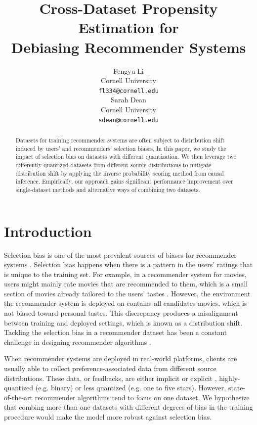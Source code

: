 \documentclass{article}
\title{Cross-Dataset Propensity Estimation for \\Debiasing Recommender Systems}
\author{%
  Fengyu Li \\
  Cornell University\\
  \texttt{fl334@cornell.edu} \\
  \And
  Sarah Dean \\
  Cornell University \\
  \texttt{sdean@cornell.edu} \\
}
\begin{document}
\maketitle


\begin{abstract}
  Datasets for training recommender systems are often subject to distribution shift induced by users' and recommenders' selection biases. In this paper, we study the impact of selection bias on datasets with different quantization. We then leverage two differently quantized datasets from different source distributions to mitigate distribution shift by applying the inverse probability scoring method from causal inference. Empirically, our approach gains significant performance improvement over single-dataset methods and alternative ways of combining two datasets. 
\end{abstract}

\section{Introduction}
Selection bias is one of the most prevalent sources of biases for recommender systems \cite{chen2020bias}. Selection bias happens when there is a pattern in the users' ratings that is unique to the training set. For example, in a recommender system for movies, users might mainly rate movies that are recommended to them, which is a small section of movies already tailored to the users' tastes \cite{pradel2012ranking}. However, the environment the recommender system is deployed on contains all candidates movies, which is not biased toward personal tastes. This discrepancy produces a misalignment between training and deployed settings, which is known as a distribution shift. Tackling the selection bias in a recommender dataset has been a constant challenge in designing recommender algorithms \cite{schnabel2016recommendations}.

When recommender systems are deployed in real-world platforms, clients are usually able to collect preference-associated data from different source distributions. These data, or feedbacks, are either implicit or explicit \cite{aggarwal2016recommender}, highly-quantized (e.g. binary) or less quantized (e.g. one to five stars). However, state-of-the-art recommender algorithms tend to focus on one dataset. We hypothesize that combing more than one datasets with different degrees of bias in the training procedure would make the model more robust against selection bias.
\end{document}
